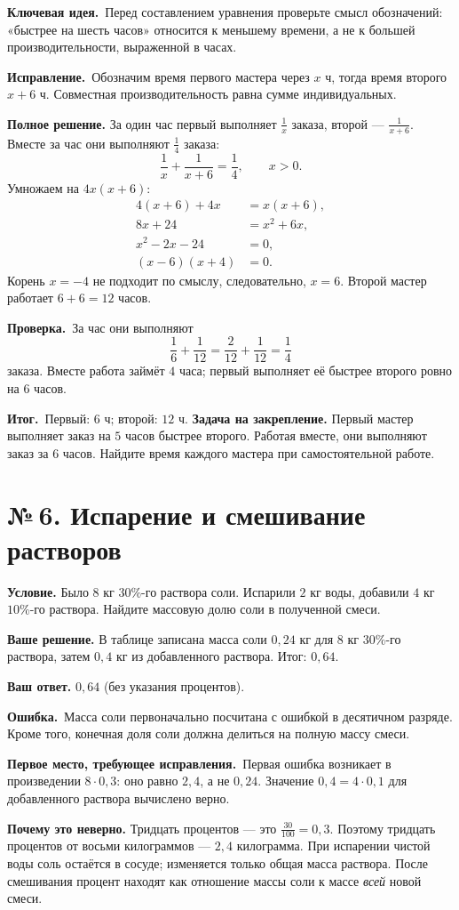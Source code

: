 \documentclass[a4paper,12pt]{article}
\newcommand{\errlabel}{\textcolor{err}{\textbf{Ошибка.}}}
\newcommand{\keylabel}{\textcolor{accent}{\textbf{Ключевая идея.}}}
\newcommand{\resultlabel}{\textcolor{accent}{\textbf{Итог.}}}
\newcommand{\reviewtask}[2]{\clearpage\phantomsection\label{task:#1}\section*{\textcolor{accent}{№\,#1. #2}}}
\newcommand{\firstwrong}{\textbf{Первое место, требующее исправления.}}
\newcommand{\fix}{\textbf{Исправление.}}
\newcommand{\verify}{\textbf{Проверка.}}
\newcommand{\practice}{\medskip\textbf{Задача на закрепление.} }
\begin{document}
\keylabel\ Перед составлением уравнения проверьте смысл обозначений: «быстрее на шесть часов» относится к меньшему времени, а не к большей производительности, выраженной в часах.

\fix\ Обозначим время первого мастера через $x$ ч, тогда время второго $x+6$ ч. Совместная производительность равна сумме индивидуальных.

\textbf{Полное решение.} За один час первый выполняет $\frac1x$ заказа, второй --- $\frac1{x+6}$. Вместе за час они выполняют $\frac14$ заказа:
\[
\frac1x+\frac1{x+6}=\frac14,\qquad x>0.
\]
Умножаем на $4x(x+6)$:
\begin{align*}
4(x+6)+4x&=x(x+6),\\
8x+24&=x^2+6x,\\
x^2-2x-24&=0,\\
(x-6)(x+4)&=0.
\end{align*}
Корень $x=-4$ не подходит по смыслу, следовательно, $x=6$. Второй мастер работает $6+6=12$ часов.

\verify\ За час они выполняют
\[
\frac16+\frac1{12}=\frac2{12}+\frac1{12}=\frac14
\]
заказа. Вместе работа займёт $4$ часа; первый выполняет её быстрее второго ровно на $6$ часов.

\resultlabel\ $\boxed{\text{Первый: }6\text{ ч; второй: }12\text{ ч}}$.
\practice Первый мастер выполняет заказ на $5$ часов быстрее второго. Работая вместе, они выполняют заказ за $6$ часов. Найдите время каждого мастера при самостоятельной работе.

\reviewtask{6}{Испарение и смешивание растворов}
\textbf{Условие.} Было $8$ кг $30\%$-го раствора соли. Испарили $2$ кг воды, добавили $4$ кг $10\%$-го раствора. Найдите массовую долю соли в полученной смеси.

\textbf{Ваше решение.} В таблице записана масса соли $0{,}24$ кг для $8$ кг $30\%$-го раствора, затем $0{,}4$ кг из добавленного раствора. Итог: $0{,}64$.

\textbf{Ваш ответ.} $0{,}64$ (без указания процентов).

\errlabel\ Масса соли первоначально посчитана с ошибкой в десятичном разряде. Кроме того, конечная доля соли должна делиться на полную массу смеси.

\firstwrong\ Первая ошибка возникает в произведении $8\cdot0{,}3$: оно равно $2{,}4$, а не $0{,}24$. Значение $0{,}4=4\cdot0{,}1$ для добавленного раствора вычислено верно.

\textbf{Почему это неверно.} Тридцать процентов --- это $\frac{30}{100}=0{,}3$. Поэтому тридцать процентов от восьми килограммов --- $2{,}4$ килограмма. При испарении чистой воды соль остаётся в сосуде; изменяется только общая масса раствора. После смешивания процент находят как отношение массы соли к массе \emph{всей} новой смеси.
\end{document}
